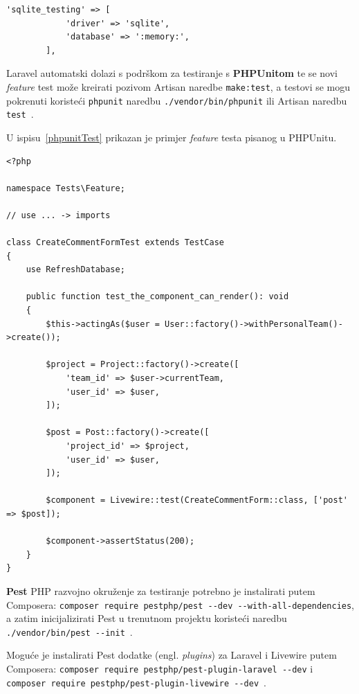 \begin{lstlisting}[caption={Testno okruženje baze podataka definirano u \texttt{config/database.php}}, label=sqliteTesting]
        'sqlite_testing' => [
            'driver' => 'sqlite',
            'database' => ':memory:',
        ],
\end{lstlisting}

Laravel automatski dolazi s podrškom za testiranje s \textbf{PHPUnitom} te se novi \textit{feature} test može kreirati pozivom Artisan naredbe \texttt{make:test}, a testovi se mogu pokrenuti koristeći \texttt{phpunit} naredbu \texttt{./vendor/bin/phpunit} ili Artisan naredbu \texttt{test}~\cite{testing}.

U ispisu~\ref{phpunitTest} prikazan je primjer \textit{feature} testa pisanog u PHPUnitu.

\begin{lstlisting}[caption={\texttt{CreateCommentFormTest} - \texttt{test\_the\_component\_can\_render}}, label=phpunitTest]
<?php

namespace Tests\Feature;

// use ... -> imports

class CreateCommentFormTest extends TestCase
{
    use RefreshDatabase;

    public function test_the_component_can_render(): void
    {
        $this->actingAs($user = User::factory()->withPersonalTeam()->create());

        $project = Project::factory()->create([
            'team_id' => $user->currentTeam,
            'user_id' => $user,
        ]);

        $post = Post::factory()->create([
            'project_id' => $project,
            'user_id' => $user,
        ]);

        $component = Livewire::test(CreateCommentForm::class, ['post' => $post]);

        $component->assertStatus(200);
    }
}

\end{lstlisting}

\textbf{Pest} PHP razvojno okruženje za testiranje potrebno je instalirati putem Composera: \texttt{composer require pestphp/pest -{}-dev -{}-with-all-dependencies}, \\ a zatim inicijalizirati Pest u trenutnom projektu koristeći naredbu \\ \texttt{./vendor/bin/pest -{}-init}~\cite{pestInstallation}.

Moguće je instalirati Pest dodatke (engl. \textit{plugins}) za Laravel i Livewire putem Composera: \texttt{composer require pestphp/pest-plugin-laravel -{}-dev} i \\ \texttt{composer require pestphp/pest-plugin-livewire -{}-dev}~\cite{pestPlugins}.

